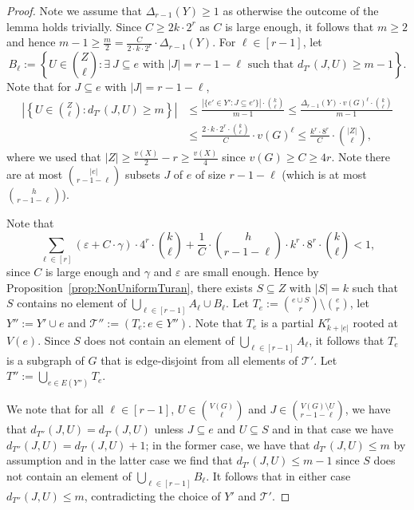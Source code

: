 \documentclass[11pt]{article}
\newcounter{i}
\theoremstyle{plain}
\theoremstyle{plain} %
\theoremstyle{definition}
\begin{document}
\begin{proof}
Note we assume that $\Delta_{r-1}(Y)\ge 1$ as otherwise the outcome of the lemma holds trivially. Since $C\ge 2k\cdot 2^r$ as $C$ is large enough, it follows that $m\ge 2$ and hence $m-1\ge \frac{m}{2} = \frac{C}{2\cdot k\cdot 2^r}\cdot \Delta_{r-1}(Y)$.  For $\ell \in [r-1]$, let
$$B_{\ell} := \left\{ U\in \binom{Z}{\ell}: \exists~J \subseteq e \text{ with } |J|=r-1-\ell \text{ such that } d_{T'}(J,U) \ge  m-1 \right\}.$$ 
Note that for $J\subseteq e$ with $|J|=r-1-\ell$,
\begin{align*}
\left|\left\{ U\in \binom{Z}{\ell}: d_{T'}(J,U)\ge m\right\}\right| &\le \frac{|\{e' \in Y': J\subseteq e'\}| \cdot \binom{k}{\ell}}{m-1} \le \frac{\Delta_{r-1}(Y)\cdot v(G)^{\ell}\cdot \binom{k}{\ell}}{m-1} \\
&\le \frac{2\cdot k\cdot 2^r\cdot \binom{k}{\ell}}{C} \cdot v(G)^{\ell} \le \frac{k^r\cdot 8^r}{C}\cdot \binom{|Z|}{\ell},
\end{align*}
where we used that $|Z|\ge \frac{v(X)}{2}-r\ge \frac{v(X)}{4}$ since $v(G)\ge C \ge 4r$. Note there are at most $\binom{|e|}{r-1-\ell}$ subsets $J$ of $e$ of size $r-1-\ell$ (which is at most $\binom{h}{r-1-\ell}$). 

Note that 
$$\sum_{\ell \in [r]} (\varepsilon +C\cdot \gamma)\cdot 4^r\cdot \binom{k}{\ell} + \frac{1}{C}\cdot \binom{h}{r-1-\ell} \cdot k^r\cdot 8^r \cdot \binom{k}{\ell} < 1,$$ 
since $C$ is large enough and $\gamma$ and $\varepsilon$ are small enough. Hence by Proposition~\ref{prop:NonUniformTuran}, there exists $S\subseteq Z$ with $|S| = k$ such that $S$ contains no element of $\bigcup_{\ell \in [r-1]} A_{\ell}\cup B_{\ell}$. Let $T_e := \binom{e\cup S}{r} \setminus \binom{e}{r}$, let $Y'':=Y'\cup e$ and $\mathcal{T}'':=(T_e: e\in Y'')$. Note that $T_e$ is a partial $K_{k+|e|}^r$ rooted at $V(e)$. Since $S$ does not contain an element of $\bigcup_{\ell \in [r-1]} A_{\ell}$, it follows that $T_e$ is a subgraph of $G$ that is edge-disjoint from all elements of $\mathcal{T}'$. Let $T'' := \bigcup_{e\in E(Y'')} T_e$.

We note that for all $\ell\in [r-1]$, $U\in \binom{V(G)}{\ell}$ and $J\in \binom{V(G)\setminus U}{r-1-\ell}$, we have that $d_{T''}(J,U)=d_{T'}(J,U)$ unless $J\subseteq e$ and $U\subseteq S$ and in that case we have $d_{T''}(J,U)= d_{T'}(J,U)+1$; in the former case, we have that $d_{T'}(J,U)\le m$ by assumption and in the latter case we find that $d_{T'}(J,U)\le m-1$ since $S$ does not contain an element of $\bigcup_{\ell \in [r-1]} B_{\ell}$. It follows that in either case $d_{T''}(J,U)\le m$, contradicting the choice of $Y'$ and $\mathcal{T}'$.
\end{proof}
\end{document}
